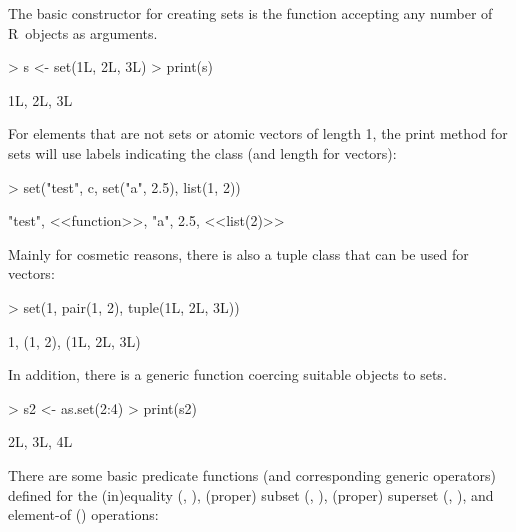 \documentclass[article]{jss}
\newcommand\R{\textsf{R}}
\newcommand{\codefun}[1]{\code{#1()}}
\newcommand{\codefunind}[1]{\codefun{#1}\index{\texttt{#1}}}
\begin{document}
The basic constructor for creating sets is the \codefunind{set}
function accepting any number of \R{}~objects as arguments.
\begin{Schunk}
\begin{Sinput}
> s <- set(1L, 2L, 3L)
> print(s)
\end{Sinput}
\begin{Soutput}
{1L, 2L, 3L}
\end{Soutput}
\end{Schunk}
For elements that are not sets or atomic vectors of length 1, the
print method for sets will use labels indicating the class (and
length for vectors):
\begin{Schunk}
\begin{Sinput}
> set("test", c, set("a", 2.5), list(1, 2))
\end{Sinput}
\begin{Soutput}
{"test", <<function>>, {"a", 2.5}, <<list(2)>>}
\end{Soutput}
\end{Schunk}
Mainly for cosmetic reasons, there is also a tuple class that can be
used for vectors:
\begin{Schunk}
\begin{Sinput}
> set(1, pair(1, 2), tuple(1L, 2L, 3L))
\end{Sinput}
\begin{Soutput}
{1, (1, 2), (1L, 2L, 3L)}
\end{Soutput}
\end{Schunk}
In addition, there is a generic \codefunind{as.set}
function coercing suitable objects to sets.
\begin{Schunk}
\begin{Sinput}
> s2 <- as.set(2:4)
> print(s2)
\end{Sinput}
\begin{Soutput}
{2L, 3L, 4L}
\end{Soutput}
\end{Schunk}
There are some basic predicate functions (and corresponding generic operators)
defined for the (in)equality (\code{!=}, \code{==}),
(proper) subset (\code{<}, \code{<=}), (proper) superset (\code{>},
\code{>=}), and element-of () operations:
\end{document}
